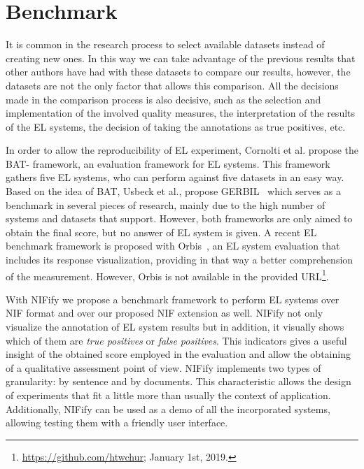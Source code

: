 \documentclass{llncs}
\begin{document}
\section{Benchmark}

It is common in the research process to select available datasets instead of creating new ones. In this way we can take advantage of the previous results that other authors have had with these datasets to compare our results, however, the datasets are not the only factor that allows this comparison. All the decisions made in the comparison process is also decisive, such as the selection and implementation of the involved quality measures, the interpretation of the results of the EL systems, the decision of taking the annotations as true positives, etc.

In order to allow the reproducibility of EL experiment, Cornolti et al.\cite{BAT2013} propose the BAT- framework, an evaluation framework for EL systems.  This framework gathers five EL systems, who can perform against five datasets in an easy way. Based on the idea of BAT, Usbeck et al., propose GERBIL~\cite{gerbil-2015} which serves as a benchmark in several pieces of research, mainly due to the high number of systems and datasets that support. However, both frameworks are only aimed to obtain the final score, but no answer of EL system is given. A recent EL benchmark framework is proposed with Orbis~\cite{Orbis2018}, an EL system evaluation that includes its response visualization, providing in that way a better comprehension of the measurement. However, Orbis is not available in the provided URL\footnote{\url{https://github.com/htwchur}; January 1st, 2019.}. 

With NIFify we propose a benchmark framework to perform EL systems over NIF format and over our proposed NIF extension as well. NIFify not only visualize the annotation of EL system results but in addition, it visually shows which of them are \textit{true positives} or \textit{false positives}. This indicators gives a useful insight of the obtained score employed in the evaluation and allow the obtaining of a qualitative assessment point of view. NIFify implements two types of granularity: by sentence and by documents. This characteristic allows the design of experiments that fit a little more than usually the context of application. Additionally, NIFify can be used as a demo of all the incorporated systems, allowing testing them with a friendly user interface.


\end{document}
